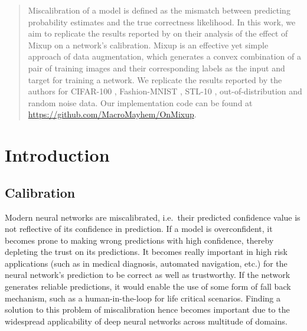 \begin{abstract}
    Miscalibration of a model is defined as the mismatch between predicting probability estimates and the true correctness likelihood. In this work, we aim to replicate the results reported by \cite{onmixup} on their analysis of the effect of Mixup \cite{mixup_2018} on a network's calibration. Mixup is an effective yet simple approach of data augmentation, which generates a convex combination of a pair of training images and their corresponding labels as the input and target for training a network. We replicate the results reported by the authors for CIFAR-100 \cite{cifar100}, Fashion-MNIST \cite{fmnist}, STL-10 \cite{stl10}, out-of-distribution and random noise data. Our implementation code can be found at \url{https://github.com/MacroMayhem/OnMixup}.
  \end{abstract}

\section{Introduction}
  
\subsection{Calibration}
Modern neural networks are miscalibrated, i.e.\ their predicted confidence value is not reflective of its confidence in prediction. If a model is overconfident, it becomes prone to making wrong predictions with high confidence, thereby depleting the trust on its predictions. It becomes really important in high risk applications (such as in medical diagnosis, automated navigation, etc.) for the neural network's prediction to be correct as well as trustworthy. If the network generates reliable predictions, it would enable the use of some form of fall back mechanism, such as a human-in-the-loop for life critical scenarios. Finding a solution to this problem of miscalibration hence becomes important due to the widespread applicability of deep neural networks %
across multitude of domains.

